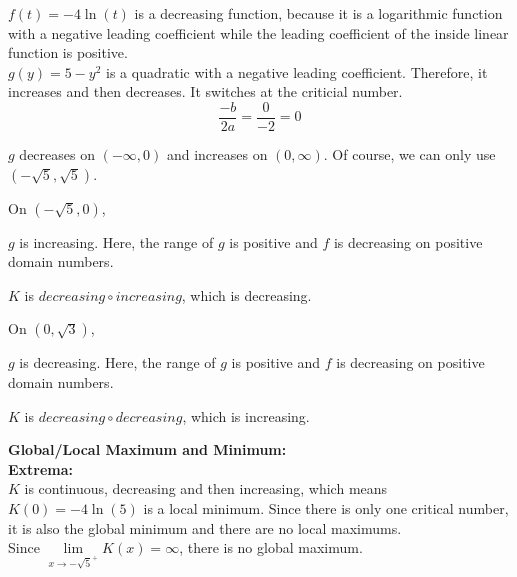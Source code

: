 \documentclass{ximera}
\begin{document}
$f(t) = -4 \ln(t)$ is a decreasing function, because it is a logarithmic function with a negative leading coefficient while the leading coefficient of the inside linear function is  positive. \\

$g(y) = 5 - y^2$ is a quadratic with a negative leading coefficient.  Therefore, it increases and then decreases.   It switches at the criticial number.\\



\[
\frac{-b}{2 a} = \frac{0}{-2} = 0
\]


$g$ decreases on $(-\infty, 0)$ and increases on $(0, \infty)$.  Of course, we can only use $(-\sqrt{5}, \sqrt{5})$.





On $(-\sqrt{5}, 0)$, 


$g$ is increasing. Here, the range of $g$ is positive and $f$ is decreasing on positive domain numbers.

\begin{center}
$K$ is $decreasing \circ increasing$, which is decreasing. \\
\end{center}




On $(0, \sqrt{3})$, 


$g$ is decreasing. Here, the range of $g$ is positive and $f$ is decreasing on positive domain numbers.


\begin{center}
$K$ is $decreasing \circ decreasing$, which is increasing. \\
\end{center}







\textbf{\textcolor{blue!55!black}{Global/Local Maximum and Minimum:}} \\
\textbf{Extrema:} \\

$K$ is continuous, decreasing and then increasing, which means $K(0) = -4 \ln(5)$ is a local minimum. Since there is only one critical number, it is also the global minimum and there are no local maximums.\\



Since $\lim\limits_{x \to -\sqrt{5}^+} K(x) = \infty$,  there is no global maximum.
\end{document}
